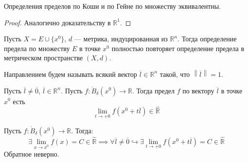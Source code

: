 \documentclass[11pt]{article}
\begin{document}
\begin{theorem}
    Определения пределов по Коши и по Гейне по множеству эквивалентны.
\end{theorem}

\begin{proof}
    Аналогично доказательству в $\mathbb{R}^1$.
\end{proof}

\begin{remark}
    Пусть $X = E \cup \{x^0\}$, $d$ --- метрика, индуцированная из $\mathbb{R}^n$. Тогда 
    определение предела по множеству $E$ в точке $x^0$ полностью повторяет определение предела 
    в метрическом пространстве $(X, d)$.
\end{remark}

\begin{definition}
    Направлением будем называть всякий вектор $\overline{l} \in \mathbb{R}^n$ такой, что 
    $\left\lVert \overline{l} \right\rVert = 1$.
\end{definition}

\begin{definition}
    Пусть $\overline{l} \neq \overline{0}$, $\overline{l} \in \mathbb{R}^n$. Пусть $f \colon \mathring{B}_{\delta}(x^0) \to \mathbb{R}$.
    Тогда предел $f$ по вектору $\overline{l}$ в точке $x^0$ есть 
    \[\lim_{t \to +0} f\left(x^0 + t \overline{l}\right) \in \widehat{\mathbb{R}}\]
\end{definition}

\begin{lemma} \label{lemma:1.1}
    Пусть $f \colon \mathring{B}_{\delta} \left(x^0\right) \to \mathbb{R}$. Тогда:
    \[\exists \lim_{x \to x^0} f(x) = C \in \widehat{\mathbb{R}} \implies \forall \overline{l} \neq \overline{0}
    \hookrightarrow \exists \lim_{t \to +0} f \left(x^0 + t \overline{l} \right) = C \in \widehat{\mathbb{R}} \]
    Обратное неверно.
\end{lemma}
\end{document}

